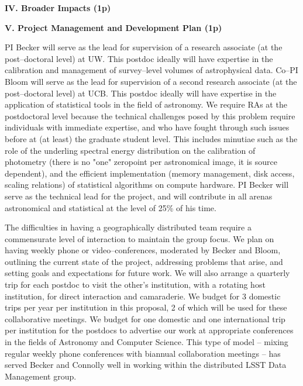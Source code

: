 \bigskip \centerline{\bf IV. Broader Impacts (1p)} \smallskip \smallskip



\bigskip \centerline{\bf V. Project Management and Development Plan (1p)}
\smallskip

PI Becker will serve as the lead for supervision of a research associate (at the
post--doctoral level) at UW.  This postdoc ideally will have expertise in the
calibration and management of survey--level volumes of astrophysical data.
Co--PI Bloom will serve as the lead for supervision of a second research
associate (at the post--doctoral level) at UCB.  This postdoc ideally will have
expertise in the application of statistical tools in the field of astronomy.  We
require RAs at the postdoctoral level because the technical challenges posed by
this problem require individuals with immediate expertise, and who have fought
through such issues before at (at least) the graduate student level. This
includes minutiae such as the role of the underling spectral energy distribution
on the calibration of photometry (there is no "one" zeropoint per astronomical
image, it is source dependent), and the efficient implementation (memory
management, disk access, scaling relations) of statistical algorithms on compute
hardware. PI Becker will serve as the technical lead for the project, and will
contribute in all arenas astronomical and statistical at the level of 25\% of
his time.

The difficulties in having a geographically distributed team require a
commensurate level of interaction to maintain the group focus.  We plan on
having weekly phone or video--conferences, moderated by Becker and Bloom,
outlining the current state of the project, addressing problems that arise, and
setting goals and expectations for future work.  We will also arrange a
quarterly trip for each postdoc to visit the other's institution, with a
rotating host institution, for direct interaction and camaraderie. We budget for
3 domestic trips per year per institution in this proposal, 2 of which will be
used for these collaborative meetings.  We budget for one domestic and one
international trip per institution for the postdocs to advertise our work at
appropriate conferences in the fields of Astronomy and Computer Science. This
type of model -- mixing regular weekly phone conferences with biannual
collaboration meetings -- has served Becker and Connolly well in working within
the distributed LSST Data Management group.

